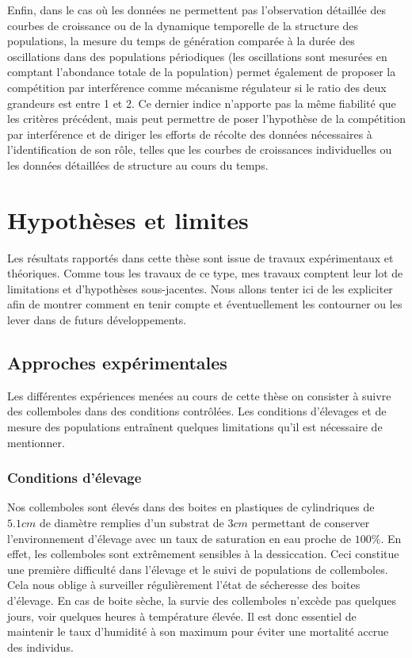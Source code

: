 Enfin, dans le cas où les données ne permettent pas l'observation détaillée des
courbes de croissance ou de la dynamique temporelle de la structure des
populations, la mesure du temps de génération comparée à la durée des
oscillations dans des populations périodiques (les oscillations sont mesurées en
comptant l'abondance totale de la population) permet également de proposer la
compétition par interférence comme mécanisme régulateur si le ratio des deux
grandeurs est entre 1 et 2. Ce dernier indice n'apporte pas la même fiabilité
que les critères précédent, mais peut permettre de poser l'hypothèse de la
compétition par interférence et de diriger les efforts de récolte des données
nécessaires à l'identification de son rôle, telles que les courbes de
croissances individuelles ou les données détaillées de structure au cours du
temps. 

\section{Hypothèses et limites}

Les résultats rapportés dans cette thèse sont issue de travaux expérimentaux et
théoriques. Comme tous les travaux de ce type, mes travaux comptent leur lot de
limitations et d'hypothèses sous-jacentes. Nous allons tenter ici de les
expliciter afin de montrer comment en tenir compte et éventuellement les
contourner ou les lever dans de futurs développements. 

\subsection{Approches expérimentales}

Les différentes expériences menées au cours de cette thèse on consister à suivre
des collemboles dans des conditions contrôlées. Les conditions d'élevages et de
mesure des populations entraînent quelques limitations qu'il est nécessaire de
mentionner.

\subsubsection{Conditions d'élevage}

Nos collemboles sont élevés dans des boites en plastiques de cylindriques de
$5.1cm$ de diamètre remplies d'un substrat de $3cm$ permettant de conserver
l'environnement d'élevage avec un taux de saturation en eau proche de $100\%$.
En effet, les collemboles sont extrêmement sensibles à la dessiccation. Ceci
constitue une première difficulté dans l'élevage et le suivi de populations de
collemboles. Cela nous oblige à surveiller régulièrement l'état de sécheresse
des boites d'élevage. En cas de boite sèche, la survie des collemboles n'excède
pas quelques jours, voir quelques heures à température élevée. Il est donc
essentiel de maintenir le taux d'humidité à son maximum pour éviter une
mortalité accrue des individus. 

